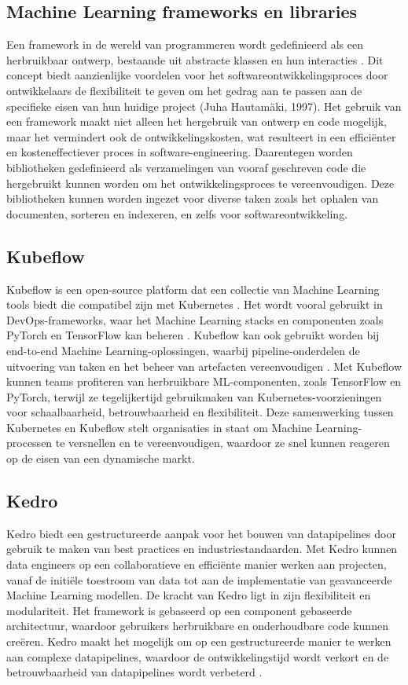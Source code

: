 \subsection{Machine Learning frameworks en libraries}
Een framework in de wereld van programmeren wordt gedefinieerd als een herbruikbaar ontwerp, bestaande uit abstracte klassen en hun interacties \autocite{JuhaHautamaeki1997}. Dit concept biedt aanzienlijke voordelen voor het softwareontwikkelingsproces door ontwikkelaars de flexibiliteit te geven om het gedrag aan te passen aan de specifieke eisen van hun huidige project (Juha Hautamäki, 1997). Het gebruik van een framework maakt niet alleen het hergebruik van ontwerp en code mogelijk, maar het vermindert ook de ontwikkelingskosten, wat resulteert in een efficiënter en kosteneffectiever proces in software-engineering. Daarentegen worden bibliotheken gedefinieerd als verzamelingen van vooraf geschreven code die hergebruikt kunnen worden om het ontwikkelingsproces te vereenvoudigen. Deze bibliotheken kunnen worden ingezet voor diverse taken zoals het ophalen van documenten, sorteren en indexeren, en zelfs voor softwareontwikkeling.
\subsection{Kubeflow}
Kubeflow is een open-source platform dat een collectie van Machine Learning tools biedt die compatibel zijn met Kubernetes \autocite{Kubeflow2021}. Het wordt vooral gebruikt in DevOps-frameworks, waar het Machine Learning stacks en componenten zoals PyTorch en TensorFlow kan beheren \autocite{NGC2021}.
Kubeflow kan ook gebruikt worden bij end-to-end Machine Learning-oplossingen, waarbij pipeline-onderdelen de uitvoering van taken en het beheer van artefacten vereenvoudigen \autocite{Bisong2019}.
Met Kubeflow kunnen teams profiteren van herbruikbare ML-componenten, zoals TensorFlow en PyTorch, terwijl ze tegelijkertijd gebruikmaken van Kubernetes-voorzieningen voor schaalbaarheid, betrouwbaarheid en flexibiliteit. Deze samenwerking tussen Kubernetes en Kubeflow stelt organisaties in staat om Machine Learning-processen te versnellen en te vereenvoudigen, waardoor ze snel kunnen reageren op de eisen van een dynamische markt.
\subsection{Kedro}
Kedro biedt een gestructureerde aanpak voor het bouwen van datapipelines door gebruik te maken van best practices en industriestandaarden. Met Kedro kunnen data engineers op een collaboratieve en efficiënte manier werken aan projecten, vanaf de initiële toestroom van data tot aan de implementatie van geavanceerde Machine Learning modellen.
De kracht van Kedro ligt in zijn flexibiliteit en modulariteit. Het framework is gebaseerd op een component gebaseerde architectuur, waardoor gebruikers herbruikbare en onderhoudbare code kunnen creëren. Kedro maakt het mogelijk om op een gestructureerde manier te werken aan complexe datapipelines, waardoor de ontwikkelingstijd wordt verkort en de betrouwbaarheid van datapipelines wordt verbeterd \autocite{Kedro2024}.
